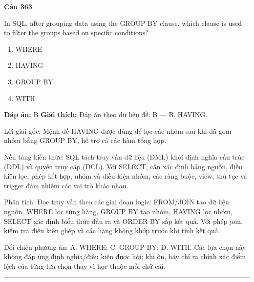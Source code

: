 \documentclass[11pt,a4paper]{article}
\newenvironment{question}[1]{%
  \par\vspace{1em}\noindent\textbf{\large Câu #1}\par\vspace{0.4em}
}{%
  \par\vspace{1em}\hrule\vspace{0.6em}
}
\newenvironment{choices}{%
  \begin{enumerate}[label=\textbf{\Alph*.},leftmargin=2.2em,itemsep=2pt,topsep=3pt]
}{%
  \end{enumerate}
}
\newcommand{\choice}{\item}
\begin{document}
\begin{question}{363}
In SQL, after grouping data using the GROUP BY clause, which clause is used to filter the groups based on specific conditions?
\begin{choices}
\choice WHERE
\choice HAVING
\choice GROUP BY
\choice WITH
\end{choices}
\textbf{Đáp án:} B
\textbf{Giải thích:} Đáp án theo dữ liệu đề: B — B. HAVING.

Lời giải gốc: Mệnh đề HAVING được dùng để lọc các nhóm sau khi đã gom nhóm bằng GROUP BY, hỗ trợ cả các hàm tổng hợp.

Nền tảng kiến thức: SQL tách truy vấn dữ liệu (DML) khỏi định nghĩa cấu trúc (DDL) và quyền truy cập (DCL). Với SELECT, cần xác định bảng nguồn, điều kiện lọc, phép kết hợp, nhóm và điều kiện nhóm; các ràng buộc, view, thủ tục và trigger đảm nhiệm các vai trò khác nhau.

Phân tích: Đọc truy vấn theo các giai đoạn logic: FROM/JOIN tạo dữ liệu nguồn, WHERE lọc từng hàng, GROUP BY tạo nhóm, HAVING lọc nhóm, SELECT xác định biểu thức đầu ra và ORDER BY sắp kết quả. Với phép join, kiểm tra điều kiện ghép và các hàng không khớp trước khi tính kết quả.

Đối chiếu phương án: A. WHERE; C. GROUP BY; D. WITH. Các lựa chọn này không đáp ứng định nghĩa/điều kiện được hỏi; khi ôn, hãy chỉ ra chính xác điểm lệch của từng lựa chọn thay vì học thuộc mỗi chữ cái.
\end{question}
\end{document}
